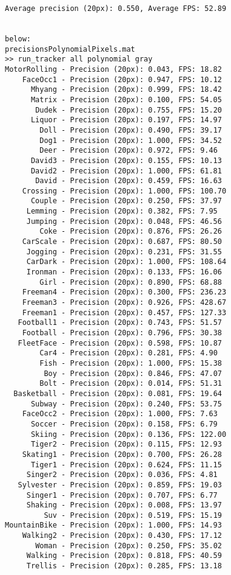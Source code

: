 \begin{lstlisting}
Average precision (20px): 0.550, Average FPS: 52.89


below:
precisionsPolynomialPixels.mat
>> run_tracker all polynomial gray
MotorRolling - Precision (20px): 0.043, FPS: 18.82
    FaceOcc1 - Precision (20px): 0.947, FPS: 10.12
      Mhyang - Precision (20px): 0.999, FPS: 18.42
      Matrix - Precision (20px): 0.100, FPS: 54.05
       Dudek - Precision (20px): 0.755, FPS: 15.20
      Liquor - Precision (20px): 0.197, FPS: 14.97
        Doll - Precision (20px): 0.490, FPS: 39.17
        Dog1 - Precision (20px): 1.000, FPS: 34.52
        Deer - Precision (20px): 0.972, FPS: 9.46
      David3 - Precision (20px): 0.155, FPS: 10.13
      David2 - Precision (20px): 1.000, FPS: 61.81
       David - Precision (20px): 0.459, FPS: 16.63
    Crossing - Precision (20px): 1.000, FPS: 100.70
      Couple - Precision (20px): 0.250, FPS: 37.97
     Lemming - Precision (20px): 0.382, FPS: 7.95
     Jumping - Precision (20px): 0.048, FPS: 46.56
        Coke - Precision (20px): 0.876, FPS: 26.26
    CarScale - Precision (20px): 0.687, FPS: 80.50
     Jogging - Precision (20px): 0.231, FPS: 31.55
     CarDark - Precision (20px): 1.000, FPS: 108.64
     Ironman - Precision (20px): 0.133, FPS: 16.06
        Girl - Precision (20px): 0.890, FPS: 68.88
    Freeman4 - Precision (20px): 0.300, FPS: 236.23
    Freeman3 - Precision (20px): 0.926, FPS: 428.67
    Freeman1 - Precision (20px): 0.457, FPS: 127.33
   Football1 - Precision (20px): 0.743, FPS: 51.57
    Football - Precision (20px): 0.796, FPS: 30.38
   FleetFace - Precision (20px): 0.598, FPS: 10.87
        Car4 - Precision (20px): 0.281, FPS: 4.90
        Fish - Precision (20px): 1.000, FPS: 15.38
         Boy - Precision (20px): 0.846, FPS: 47.07
        Bolt - Precision (20px): 0.014, FPS: 51.31
  Basketball - Precision (20px): 0.081, FPS: 19.64
      Subway - Precision (20px): 0.240, FPS: 53.75
    FaceOcc2 - Precision (20px): 1.000, FPS: 7.63
      Soccer - Precision (20px): 0.158, FPS: 6.79
      Skiing - Precision (20px): 0.136, FPS: 122.00
      Tiger2 - Precision (20px): 0.115, FPS: 12.93
    Skating1 - Precision (20px): 0.700, FPS: 26.28
      Tiger1 - Precision (20px): 0.624, FPS: 11.15
     Singer2 - Precision (20px): 0.036, FPS: 4.81
   Sylvester - Precision (20px): 0.859, FPS: 19.03
     Singer1 - Precision (20px): 0.707, FPS: 6.77
     Shaking - Precision (20px): 0.008, FPS: 13.97
         Suv - Precision (20px): 0.519, FPS: 15.19
MountainBike - Precision (20px): 1.000, FPS: 14.93
    Walking2 - Precision (20px): 0.430, FPS: 17.12
       Woman - Precision (20px): 0.250, FPS: 35.02
     Walking - Precision (20px): 0.818, FPS: 40.59
     Trellis - Precision (20px): 0.285, FPS: 13.18


\end{lstlisting}
